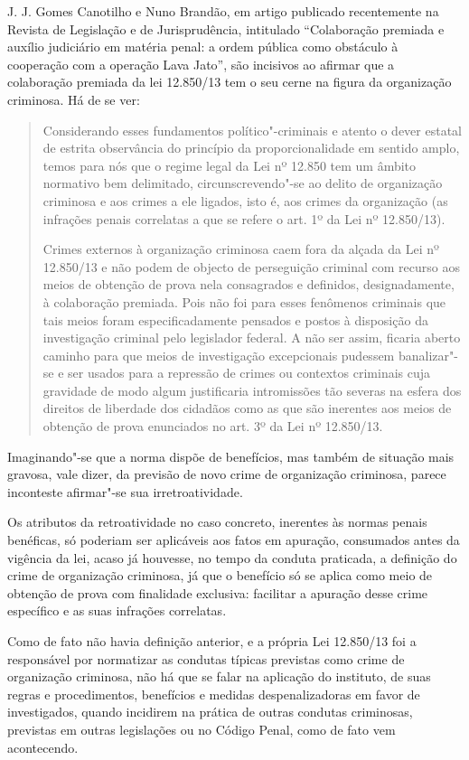 J. J. Gomes Canotilho e Nuno Brandão, em artigo publicado recentemente
na Revista de Legislação e de Jurisprudência, intitulado ``Colaboração
premiada e auxílio judiciário em matéria penal: a ordem pública como
obstáculo à cooperação com a operação Lava Jato'', são incisivos ao
afirmar que a colaboração premiada da lei 12.850/13 tem o seu cerne na
figura da organização criminosa. Há de se ver:

\begin{quote}
Considerando esses fundamentos político"-criminais e atento o
dever estatal de estrita observância do princípio da proporcionalidade
em sentido amplo, temos para nós que o regime legal da Lei nº 12.850 tem
um âmbito normativo bem delimitado, circunscrevendo"-se ao delito de
organização criminosa e aos crimes a ele ligados, isto é, aos crimes da
organização (as infrações penais correlatas a que se refere o art. 1º da
Lei nº 12.850/13).

\noindent Crimes externos à organização criminosa caem fora da alçada da Lei
nº 12.850/13 e não podem de objecto de perseguição criminal com recurso
aos meios de obtenção de prova nela consagrados e definidos,
designadamente, à colaboração premiada. Pois não foi para esses
fenômenos criminais que tais meios foram especificadamente pensados e
postos à disposição da investigação criminal pelo legislador federal. A
não ser assim, ficaria aberto caminho para que meios de investigação
excepcionais pudessem banalizar"-se e ser usados para a repressão de
crimes ou contextos criminais cuja gravidade de modo algum justificaria
intromissões tão severas na esfera dos direitos de liberdade dos
cidadãos como as que são inerentes aos meios de obtenção de prova
enunciados no art. 3º da Lei nº 12.850/13.
\end{quote}

Imaginando"-se que a norma dispõe de benefícios, mas também de situação
mais gravosa, vale dizer, da previsão de novo crime de organização
criminosa, parece inconteste afirmar"-se sua irretroatividade.

Os atributos da retroatividade no caso concreto, inerentes às normas
penais benéficas, só poderiam ser aplicáveis aos fatos em apuração,
consumados antes da vigência da lei, acaso já houvesse, no tempo da
conduta praticada, a definição do crime de organização criminosa, já que
o benefício só se aplica como meio de obtenção de prova com finalidade
exclusiva: facilitar a apuração desse crime específico e as suas
infrações correlatas.

Como de fato não havia definição anterior, e a própria Lei 12.850/13 foi
a responsável por normatizar as condutas típicas previstas como crime de
organização criminosa, não há que se falar na aplicação do instituto, de
suas regras e procedimentos, benefícios e medidas despenalizadoras em
favor de investigados, quando incidirem na prática de outras condutas
criminosas, previstas em outras legislações ou no Código Penal, como de
fato vem acontecendo.

